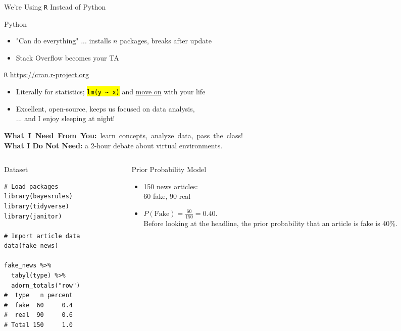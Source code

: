 \documentclass[12pt]{beamer}
\begin{document}
{
\begin{frame}{We’re Using \texttt{R} Instead of Python}
\begin{block}{Python}
\begin{itemize}
\item "Can do everything" ... installs $n$ packages, breaks after update
\item Stack Overflow becomes your TA
\end{itemize}
\end{block}
\begin{block}{\texttt{R} \quad \rightarrow \quad \url{https://cran.r-project.org}}
\begin{itemize}
\item Literally for statistics; \hl{\texttt{lm(y \textasciitilde{} x)}} and \ul{move on} with your life
\item Excellent, open-source, keeps us focused on data analysis,\\... and I enjoy sleeping at night!
\end{itemize}
\end{block}
\mbox{\textbf{What I Need From You:} learn concepts, analyze data, pass the class!}\\
\textbf{What I Do Not Need:} a 2-hour debate about virtual environments.
\end{frame}
}

\begin{frame}[fragile]{}

\begin{columns}[t]
\begin{column}{0.285\textwidth}
\begin{block}{Dataset}
\begin{verbatim}
# Load packages
library(bayesrules)
library(tidyverse)
library(janitor)

# Import article data
data(fake_news)

fake_news %>% 
  tabyl(type) %>% 
  adorn_totals("row")
#  type   n percent
#  fake  60     0.4
#  real  90     0.6
# Total 150     1.0
\end{verbatim}
\end{block}
\end{column}

\begin{column}{0.53\textwidth}
\begin{block}{Prior Probability Model}
\begin{itemize}
    \item 150 news articles:\\60 fake, 90 real
    \item $P(\text{Fake}) = \frac{60}{150} = 0.40$.\\
          Before looking at the headline, the prior probability that an article is fake is 40\%.
\end{itemize}
\end{block}
\end{column}
\end{columns}
\end{frame}
\end{document}
